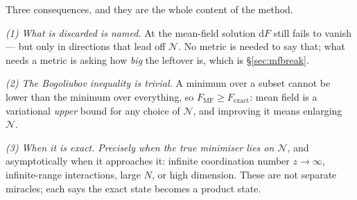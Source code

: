 \documentclass[10pt,a4paper]{article}
\newcommand{\dd}{\mathrm{d}}
\theoremstyle{plain}
\theoremstyle{definition}
\numberwithin{equation}{section}
\begin{document}
\noindent Three consequences, and they are the whole content of the method.

\emph{(1) What is discarded is named.} At the mean-field solution $\dd F$ still fails to
vanish --- but only in directions that lead off $\mathcal N$. No metric is needed to say that;
what needs a metric is asking how \emph{big} the leftover is, which is \S\ref{sec:mfbreak}.

\emph{(2) The Bogoliubov inequality is trivial.} A minimum over a subset cannot be lower than
the minimum over everything, so $F_{\mathrm{MF}}\ge F_{\mathrm{exact}}$: mean field is a
variational \emph{upper} bound for any choice of $\mathcal N$, and improving it means enlarging
$\mathcal N$.

\emph{(3) When it is exact.} \emph{Precisely when the true minimiser lies on $\mathcal N$}, and
asymptotically when it approaches it: infinite coordination number $z\to\infty$, infinite-range
interactions, large $N$, or high dimension. These are not separate miracles; each says the exact
state becomes a product state.
\end{document}
